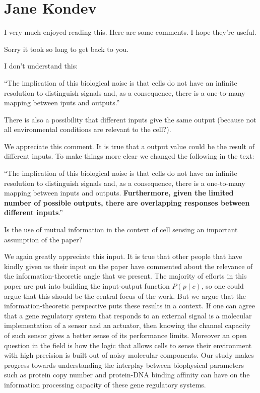 \section{Jane Kondev}

I very much enjoyed reading this. Here are some comments. I hope they're useful.

Sorry it took so long to get back to you.

\begin{tcolorbox}
I don't understand this:

``The implication of this biological noise is that cells do not have an infinite
resolution to distinguish signals and, as a consequence, there is a one-to-many
mapping between iputs and outputs.''

There is also a possibility that different inputs give the same output (because
not all environmental conditions are relevant to the cell?).
\end{tcolorbox}

We appreciate this comment. It is true that a output value could be the result
of different inputs. To make things more clear we changed the following in the
text:

``The implication of this biological noise is that cells do not have an infinite
resolution to distinguish signals and, as a consequence, there is a one-to-many
mapping between inputs and outputs. \textbf{Furthermore, given the limited
number of possible outputs, there are overlapping responses between different
inputs}.''

\begin{tcolorbox}
Is the use of mutual information in the context of cell sensing an important
assumption of the paper?
\end{tcolorbox}

We again greatly appreciate this input. It is true that other people that have
kindly given us their input on the paper have commented about the relevance of
the information-theoretic angle that we present. The majority of efforts in this
paper are put into building the input-output function $P(p \mid c)$, so one
could argue that this should be the central focus of the work. But we argue that
the information-theoretic perspective puts these results in a context. If one
can agree that a gene regulatory system that responds to an external signal is a
molecular implementation of a sensor and an actuator, then knowing the channel
capacity of such sensor gives a better sense of its performance limits. Moreover
an open question in the field is how the logic that allows cells to sense their
environment with high precision is built out of noisy molecular components. Our
study makes progress towards understanding the interplay between biophysical
parameters such as protein copy number and protein-DNA binding affinity can have
on the information processing capacity of these gene regulatory systems.


